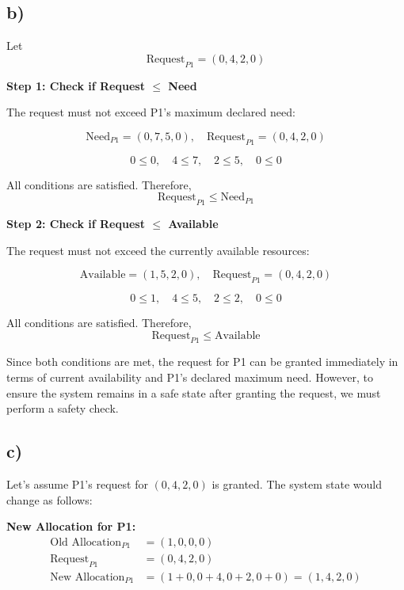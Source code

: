 \documentclass[../main.tex]{subfiles}
\begin{document}
\newpage

\subsection*{b)}

Let 
\[
\text{Request}_{P1} = (0, 4, 2, 0)
\]

\textbf{Step 1: Check if Request $\le$ Need}  

The request must not exceed P1's maximum declared need:

\[
\text{Need}_{P1} = (0, 7, 5, 0), \quad 
\text{Request}_{P1} = (0, 4, 2, 0)
\]

\[
0 \le 0, \quad 4 \le 7, \quad 2 \le 5, \quad 0 \le 0
\]

All conditions are satisfied. Therefore,
\[
\text{Request}_{P1} \le \text{Need}_{P1}
\]

\medskip

\textbf{Step 2: Check if Request $\le$ Available}  

The request must not exceed the currently available resources:

\[
\text{Available} = (1, 5, 2, 0), \quad 
\text{Request}_{P1} = (0, 4, 2, 0)
\]

\[
0 \le 1, \quad 4 \le 5, \quad 2 \le 2, \quad 0 \le 0
\]

All conditions are satisfied. Therefore,
\[
\text{Request}_{P1} \le \text{Available}
\]

\medskip

Since both conditions are met, the request for P1 can be granted immediately in terms of current availability and P1's declared maximum need. However, to ensure the system remains in a safe state after granting the request, we must perform a safety check.

\subsection*{c)}

Let's assume P1's request for $(0, 4, 2, 0)$ is granted. The system state would change as follows:

\textbf{New Allocation for P1:}
\[
\begin{aligned}
\text{Old Allocation}_{P1} &= (1, 0, 0, 0) \\
\text{Request}_{P1} &= (0, 4, 2, 0) \\
\text{New Allocation}_{P1} &= (1+0, 0+4, 0+2, 0+0) = (1, 4, 2, 0)
\end{aligned}
\]
\end{document}
